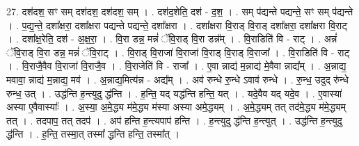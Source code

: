 \documentclass[17pt]{extarticle}
\begin{document}
27. दश॑दश॒ सꣳ सम् दश॑दश॒ दश॑दश॒ सम् । . दश॑द॒शेति॒ दश॑ - द॒श॒ । . सम् प॑द्यन्ते पद्यन्ते॒ सꣳ सम् प॑द्यन्ते । . प॒द्य॒न्ते॒ दशा᳚क्षरा॒ दशा᳚क्षरा पद्यन्ते पद्यन्ते॒ दशा᳚क्षरा । . दशा᳚क्षरा वि॒राड् वि॒राड् दशा᳚क्षरा॒ दशा᳚क्षरा वि॒राट् । . दशा᳚क्ष॒रेति॒ दश॑ - अ॒क्ष॒रा॒ । . वि॒रा डन्न॒ मन्नं॑ ॅवि॒राड् वि॒रा डन्न᳚म् । . वि॒राडिति॑ वि - राट् । . अन्नं॑ ॅवि॒राड् वि॒रा डन्न॒ मन्नं॑ ॅवि॒राट् । . वि॒राड् वि॒राजा॑ वि॒राजा॑ वि॒राड् वि॒राड् वि॒राजा᳚ । . वि॒राडिति॑ वि - राट् । . वि॒राजै॒वैव वि॒राजा॑ वि॒राजै॒व । . वि॒राजेति॑ वि - राजा᳚ । . ए॒वा न्नाद्य॑ म॒न्नाद्य॑ मे॒वैवा न्नाद्य᳚म् । . अ॒न्नाद्य॒ मवावा॒ न्नाद्य॑ म॒न्नाद्य॒ मव॑ । . अ॒न्नाद्य॒मित्य॑न्न - अद्य᳚म् । . अव॑ रुन्धे रु॒न्धे ऽवाव॑ रुन्धे । . रु॒न्ध॒ उदुद् रु॑न्धे रुन्ध॒ उत् । . उद्ध॑न्ति ह॒न्त्युदु द्ध॑न्ति । . ह॒न्ति॒ यद् यद्ध॑न्ति हन्ति॒ यत् । . यदे॒वैव यद् यदे॒व । . ए॒वास्या॑ अस्या ए॒वैवास्याः᳚ । . अ॒स्या॒ अ॒मे॒द्ध्य म॑मे॒द्ध्य म॑स्या अस्या अमे॒द्ध्यम् । . अ॒मे॒द्ध्यम् तत् तद॑मे॒द्ध्य म॑मे॒द्ध्यम् तत् । . तदपाप॒ तत् तदप॑ । . अप॑ हन्ति ह॒न्त्यपाप॑ हन्ति । . ह॒न्त्युदु द्ध॑न्ति ह॒न्त्युत् । . उद्ध॑न्ति ह॒न्त्युदु द्ध॑न्ति । . ह॒न्ति॒ तस्मा॒त् तस्मा᳚ द्धन्ति हन्ति॒ तस्मा᳚त् । \newline
\end{document}
